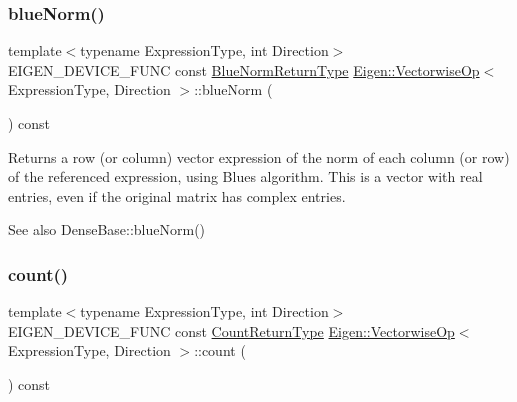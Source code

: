 \subsubsection{\texorpdfstring{blueNorm()}{blueNorm()}}
{\footnotesize\ttfamily template$<$typename Expression\+Type, int Direction$>$ \\
E\+I\+G\+E\+N\+\_\+\+D\+E\+V\+I\+C\+E\+\_\+\+F\+U\+NC const \mbox{\hyperlink{class_eigen_1_1_partial_redux_expr}{Blue\+Norm\+Return\+Type}} \mbox{\hyperlink{class_eigen_1_1_vectorwise_op}{Eigen\+::\+Vectorwise\+Op}}$<$ Expression\+Type, Direction $>$\+::blue\+Norm (\begin{DoxyParamCaption}{ }\end{DoxyParamCaption}) const\hspace{0.3cm}{\ttfamily [inline]}}

\begin{DoxyReturn}{Returns}
a row (or column) vector expression of the norm of each column (or row) of the referenced expression, using Blue\textquotesingle{}s algorithm. This is a vector with real entries, even if the original matrix has complex entries.
\end{DoxyReturn}
\begin{DoxySeeAlso}{See also}
Dense\+Base\+::blue\+Norm() 
\end{DoxySeeAlso}
\mbox{\label{class_eigen_1_1_vectorwise_op_abf7ae4a00d195d06d46ad6c269d8508f}} 
\subsubsection{\texorpdfstring{count()}{count()}}
{\footnotesize\ttfamily template$<$typename Expression\+Type, int Direction$>$ \\
E\+I\+G\+E\+N\+\_\+\+D\+E\+V\+I\+C\+E\+\_\+\+F\+U\+NC const \mbox{\hyperlink{class_eigen_1_1_partial_redux_expr}{Count\+Return\+Type}} \mbox{\hyperlink{class_eigen_1_1_vectorwise_op}{Eigen\+::\+Vectorwise\+Op}}$<$ Expression\+Type, Direction $>$\+::count (\begin{DoxyParamCaption}{ }\end{DoxyParamCaption}) const\hspace{0.3cm}{\ttfamily [inline]}}

